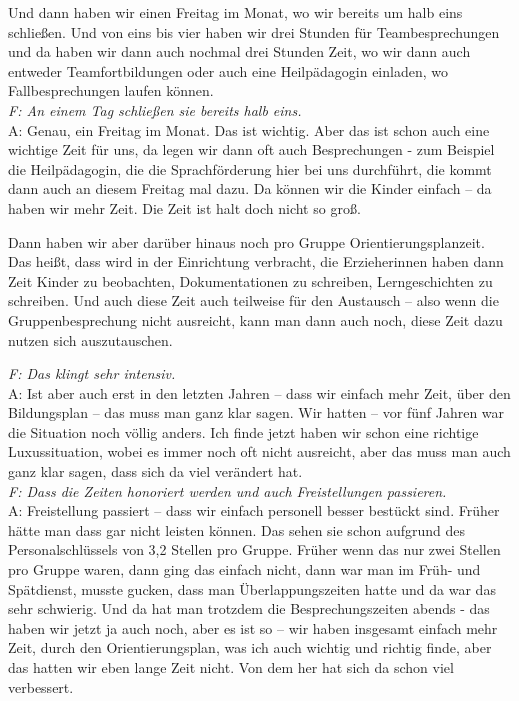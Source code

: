 \begin{linenumbers*}
Und dann haben wir einen Freitag im Monat, wo wir bereits um halb eins schließen. Und von eins bis vier haben wir drei Stunden für Teambesprechungen und da haben wir dann auch nochmal drei Stunden Zeit, wo wir dann auch entweder Teamfortbildungen oder auch eine Heilpädagogin einladen, wo Fallbesprechungen laufen können.\\
\emph{F: An einem Tag schließen sie bereits halb eins.}\\
A: Genau, ein Freitag im Monat. Das ist wichtig. Aber das ist schon auch eine wichtige Zeit für uns, da legen wir dann oft auch Besprechungen - zum Beispiel die Heilpädagogin, die die Sprachförderung hier bei uns durchführt, die kommt dann auch an diesem Freitag mal dazu. Da können wir die Kinder einfach – da haben wir mehr Zeit. Die Zeit ist halt doch nicht so groß. 

Dann haben wir aber darüber hinaus noch pro Gruppe Orientierungsplanzeit. Das heißt, dass wird in der Einrichtung verbracht, die Erzieherinnen haben dann Zeit Kinder zu beobachten, Dokumentationen zu schreiben, Lerngeschichten zu schreiben. Und auch diese Zeit auch teilweise für den Austausch – also wenn die Gruppenbesprechung nicht ausreicht, kann man dann auch noch, diese Zeit dazu nutzen sich auszutauschen. 

\emph{F: Das klingt sehr intensiv.}\\
A: Ist aber auch erst in den letzten Jahren – dass wir einfach mehr Zeit, über den Bildungsplan – das muss man ganz klar sagen. Wir hatten – vor fünf Jahren war die Situation noch völlig anders. Ich finde jetzt haben wir schon eine richtige Luxussituation, wobei es immer noch oft nicht ausreicht, aber das muss man auch ganz klar sagen, dass sich da viel verändert hat.\\
\emph{F: Dass die Zeiten honoriert werden und auch Freistellungen passieren.}\\
A: Freistellung passiert – dass wir einfach personell besser bestückt sind. Früher hätte man dass gar nicht leisten können. Das sehen sie schon aufgrund des Personalschlüssels von 3,2 Stellen pro Gruppe. Früher wenn das nur zwei Stellen pro Gruppe waren, dann ging das einfach nicht, dann war man im Früh- und Spätdienst, musste gucken, dass man Überlappungszeiten hatte und da war das sehr schwierig. Und da hat man trotzdem die Besprechungszeiten abends  - das haben wir jetzt ja auch noch, aber es ist so – wir haben insgesamt einfach mehr Zeit, durch den Orientierungsplan, was ich auch wichtig und richtig finde, aber das hatten wir eben lange Zeit nicht. Von dem her hat sich da schon viel verbessert.  


\end{linenumbers*}
